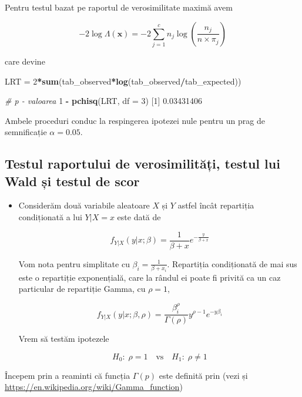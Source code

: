 \documentclass[]{article}
\newenvironment{Shaded}{\begin{snugshade}}{\end{snugshade}}
\newcommand{\KeywordTok}[1]{\textcolor[rgb]{0.13,0.29,0.53}{\textbf{#1}}}
\newcommand{\DataTypeTok}[1]{\textcolor[rgb]{0.13,0.29,0.53}{#1}}
\newcommand{\DecValTok}[1]{\textcolor[rgb]{0.00,0.00,0.81}{#1}}
\newcommand{\FloatTok}[1]{\textcolor[rgb]{0.00,0.00,0.81}{#1}}
\newcommand{\StringTok}[1]{\textcolor[rgb]{0.31,0.60,0.02}{#1}}
\newcommand{\CommentTok}[1]{\textcolor[rgb]{0.56,0.35,0.01}{\textit{#1}}}
\newcommand{\OperatorTok}[1]{\textcolor[rgb]{0.81,0.36,0.00}{\textbf{#1}}}
\newcommand{\NormalTok}[1]{#1}
\newenvironment{frshaded*}{%
  \def\FrameCommand{\fboxrule=\FrameRule\fboxsep=\FrameSep \fcolorbox{framecolor}{shadecolor1}}%
  \MakeFramed {\advance\hsize-\width \FrameRestore}}%
{\endMakeFramed}
\newenvironment{rmdblock}[1]
  {\begin{frshaded*}
  \begin{itemize}
  \renewcommand{\labelitemi}{
    \raisebox{-.7\height}[0pt][0pt]{
      {\setkeys{Gin}{width=2em,keepaspectratio}\texttt{[image: images/icons/\#1]}}
    }
  }
  \item
  }
  {
  \end{itemize}
  \end{frshaded*}
  }
\newenvironment{rmdexercise}
  {\begin{rmdblock}{exercise}}
  {\end{rmdblock}}
\begin{document}
Pentru testul bazat pe raportul de verosimilitate maximă avem

\[
  -2\log \Lambda(\mathbf{x}) = -2\sum_{j = 1}^{c} n_{j}\log\left(\frac{n_{j}}{n\times \pi_{j}}\right)
\]

care devine

\begin{Shaded}
\begin{Highlighting}[]
\NormalTok{LRT =}\StringTok{ }\DecValTok{2}\OperatorTok{*}\KeywordTok{sum}\NormalTok{(tab_observed}\OperatorTok{*}\KeywordTok{log}\NormalTok{(tab_observed}\OperatorTok{/}\NormalTok{tab_expected))}

\CommentTok{# p - valoarea}
\DecValTok{1} \OperatorTok{-}\StringTok{ }\KeywordTok{pchisq}\NormalTok{(LRT, }\DataTypeTok{df =} \DecValTok{3}\NormalTok{)}
\NormalTok{[}\DecValTok{1}\NormalTok{] }\FloatTok{0.03431406}
\end{Highlighting}
\end{Shaded}

Ambele proceduri conduc la respingerea ipotezei nule pentru un prag de
semnificație \(\alpha = 0.05\).

\subsection{Testul raportului de verosimilități, testul lui Wald și
testul de
scor}\label{testul-raportului-de-verosimilitati-testul-lui-wald-si-testul-de-scor}

\begin{rmdexercise}
Considerăm două variabile aleatoare \(X\) și \(Y\) astfel încât
repartiția condiționată a lui \(Y|X = x\) este dată de

\[
  f_{Y|X}(y|x;\beta) = \frac{1}{\beta + x}e^{-\frac{y}{\beta + x}}
\]

Vom nota pentru simplitate cu \(\beta_i = \frac{1}{\beta + x_i}\).
Repartiția condiționată de mai sus este o repartiție exponențială, care
la rândul ei poate fi privită ca un caz particular de repartiție Gamma,
cu \(\rho = 1\),

\[
  f_{Y|X}(y|x;\beta,\rho) = \frac{\beta_i^{\rho}}{\Gamma(\rho)}y^{\rho - 1}e^{-y\beta_i}
\]

Vrem să testăm ipotezele

\[
  H_0:\; \rho = 1 \quad \text{vs}\quad H_1:\; \rho\neq 1
\]
\end{rmdexercise}

Începem prin a reaminti că funcția \(\Gamma(p)\) este definită prin
(vezi și \url{https://en.wikipedia.org/wiki/Gamma_function})
\end{document}
